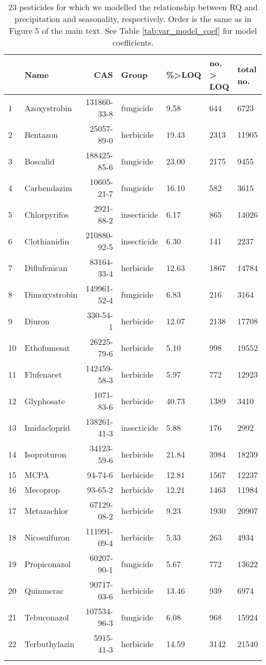 \begin{longtable}{lp{2.5cm}rlp{1.5cm}p{1.5cm}p{1.5cm}}
\caption[23 pesticides for which we modelled the relationship with precipitation and seasonality.]{23 pesticides for which we modelled the relationship between RQ and precipitation and seasonality, respectively.
                    Order is the same as in Figure 5 of the main text. See Table \ref{tab:var_model_coef} for model coefficients.} \\ 
  \toprule
 & Name & CAS & Group & \%>LOQ & no. > LOQ & total no. \\ 
  \midrule
1 & Azoxystrobin & 131860-33-8 & fungicide & 9.58 & 644 & 6723 \\ 
  2 & Bentazon & 25057-89-0 & herbicide & 19.43 & 2313 & 11905 \\ 
  3 & Boscalid & 188425-85-6 & fungicide & 23.00 & 2175 & 9455 \\ 
  4 & Carbendazim & 10605-21-7 & fungicide & 16.10 & 582 & 3615 \\ 
  5 & Chlorpyrifos & 2921-88-2 & insecticide & 6.17 & 865 & 14026 \\ 
  6 & Clothianidin & 210880-92-5 & insecticide & 6.30 & 141 & 2237 \\ 
  7 & Diflufenican & 83164-33-4 & herbicide & 12.63 & 1867 & 14784 \\ 
  8 & Dimoxystrobin & 149961-52-4 & fungicide & 6.83 & 216 & 3164 \\ 
  9 & Diuron & 330-54-1 & herbicide & 12.07 & 2138 & 17708 \\ 
  10 & Ethofumesat & 26225-79-6 & herbicide & 5.10 & 998 & 19552 \\ 
  11 & Flufenacet & 142459-58-3 & herbicide & 5.97 & 772 & 12923 \\ 
  12 & Glyphosate & 1071-83-6 & herbicide & 40.73 & 1389 & 3410 \\ 
  13 & Imidacloprid & 138261-41-3 & insecticide & 5.88 & 176 & 2992 \\ 
  14 & Isoproturon & 34123-59-6 & herbicide & 21.84 & 3984 & 18239 \\ 
  15 & MCPA & 94-74-6 & herbicide & 12.81 & 1567 & 12237 \\ 
  16 & Mecoprop & 93-65-2 & herbicide & 12.21 & 1463 & 11984 \\ 
  17 & Metazachlor & 67129-08-2 & herbicide & 9.23 & 1930 & 20907 \\ 
  18 & Nicosulfuron & 111991-09-4 & herbicide & 5.33 & 263 & 4934 \\ 
  19 & Propiconazol & 60207-90-1 & fungicide & 5.67 & 772 & 13622 \\ 
  20 & Quinmerac & 90717-03-6 & herbicide & 13.46 & 939 & 6974 \\ 
  21 & Tebuconazol & 107534-96-3 & fungicide & 6.08 & 968 & 15924 \\ 
  22 & Terbuthylazin & 5915-41-3 & herbicide & 14.59 & 3142 & 21540 \\ 
   \bottomrule
\label{tab:var_model}
\end{longtable}
